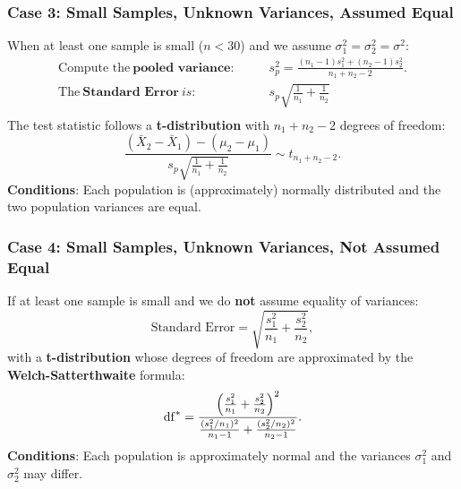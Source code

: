 \documentclass[10pt, total={6in, 8in}]{extarticle}
\begin{document}
\subsubsection{Case 3: Small Samples, Unknown Variances, Assumed Equal}
When at least one sample is small ($n < 30$) and we assume $\sigma_1^2 = \sigma_2^2 = \sigma^2$:
\begin{align*}
    \text{Compute the} \ \textbf{pooled variance}: & \quad\quad s_p^2 = \frac{(n_1 - 1)s_1^2 + (n_2 - 1)s_2^2}{n_1 + n_2 - 2}. \\
    \text{The} \ \textbf{Standard Error} \ is:     & \quad\quad s_p \sqrt{\frac{1}{n_1} + \frac{1}{n_2}}                       \\
\end{align*}
The test statistic follows a \textbf{t-distribution} with $n_1 + n_2 - 2$ degrees of freedom:
$$\frac{(\bar{X}_2 - \bar{X}_1) - (\mu_2 - \mu_1)}{s_p \sqrt{\frac{1}{n_1} + \frac{1}{n_2}}} \sim t_{n_1 + n_2 - 2}.
$$
\textbf{Conditions}: Each population is (approximately) normally distributed and the two population variances are equal.

\subsubsection{Case 4: Small Samples, Unknown Variances, Not Assumed Equal}
If at least one sample is small and we do \textbf{not} assume equality of variances:
$$
    \text{Standard Error} = \sqrt{\frac{s_1^2}{n_1} + \frac{s_2^2}{n_2}},
$$
with a \textbf{t-distribution} whose degrees of freedom are approximated by the \textbf{Welch-Satterthwaite} formula:
$$
    \mathrm{df}^* = \frac{\Bigl(\frac{s_1^2}{n_1} + \frac{s_2^2}{n_2}\Bigr)^2}{\frac{(s_1^2/n_1)^2}{n_1 - 1} + \frac{(s_2^2/n_2)^2}{n_2 - 1}}.
$$
\textbf{Conditions}: Each population is approximately normal and the variances $\sigma_1^2$ and $\sigma_2^2$ may differ.
\end{document}
